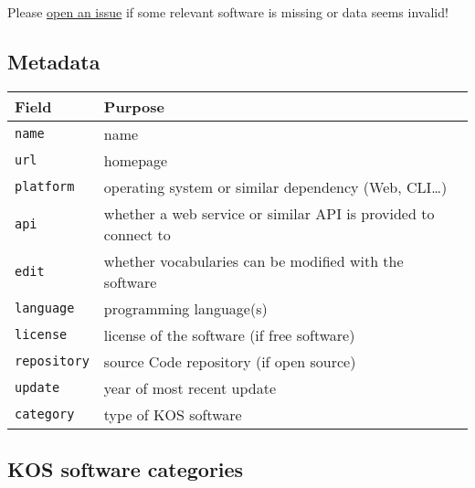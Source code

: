 \documentclass[
  DIV=10]{article}
\begin{document}
\begin{longtable}[]{@{}lllllllll@{}}
\end{longtable}

Please
\href{https://github.com/gbv/bartoc-vocabulary-software/issues}{open an
issue} if some relevant software is missing or data seems invalid!

\newpage
{}
\recalctypearea

\subsection{Metadata}\label{metadata}

\begin{longtable}[]{@{}
  >{\raggedright\arraybackslash}p{}
  >{\raggedright\arraybackslash}p{}@{}}
\toprule\noalign{}
\begin{minipage}[b]{\linewidth}\raggedright
Field
\end{minipage} & \begin{minipage}[b]{\linewidth}\raggedright
Purpose
\end{minipage} \\
\midrule\noalign{}
\endhead
\bottomrule\noalign{}
\endlastfoot
\texttt{name} & name \\
\texttt{url} & homepage \\
\texttt{platform} & operating system or similar dependency (Web,
CLI\ldots) \\
\texttt{api} & whether a web service or similar API is provided to
connect to \\
\texttt{edit} & whether vocabularies can be modified with the
software \\
\texttt{language} & programming language(s) \\
\texttt{license} & license of the software (if free software) \\
\texttt{repository} & source Code repository (if open source) \\
\texttt{update} & year of most recent update \\
\texttt{category} & type of KOS software \\
\end{longtable}

\subsection{KOS software categories}\label{kos-software-categories}
\end{document}
